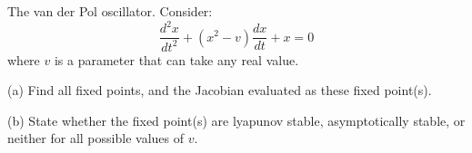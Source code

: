 \documentclass[12pt]{report}
\begin{document}
\newpage



\begin{problem}
    The van der Pol oscillator.  Consider:  $$\frac{d^2x}{dt^2} + (x^2 - v) \frac{dx}{dt} + x =0 $$ where $v$ is a parameter that can take any real value.
    \item[(a)]  Find all fixed points, and the Jacobian evaluated as these fixed point(s).
    \item[(b)]  State whether the fixed point(s) are lyapunov stable, asymptotically stable, or neither for all possible values of $v$.
\end{problem}
\end{document}
